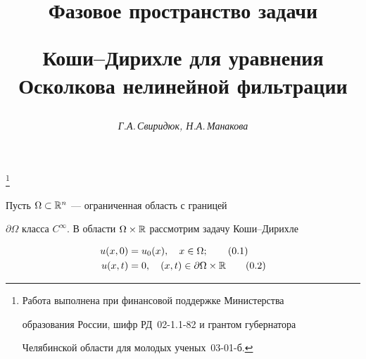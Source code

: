 

\setcounter{page}{36}















\author{\it Г.А.\,Свиридюк, Н.А.\,Манакова}




\title{Фазовое пространство задачи


Коши--Дирихле для уравнения Осколкова нелинейной фильтрации}


\thanks{Работа выполнена при финансовой поддержке Министерства


образования России, шифр РД~02-1.1-82 и грантом губернатора


Челябинской области для молодых ученых \No\,03-01-б.}





\date{}




\pagestyle{plain} %







\maketitle


\label{begin}








Пусть $\Omega \subset {\Bbb R}^n$ --- ограниченная область с границей


$\partial \Omega$ класса $C^{\infty}$. В области $\Omega \times


{\Bbb R}$ рассмотрим задачу Коши--Дирихле


\begin{align}


u(x,0) &= u_{0}(x), \quad x \in \Omega;\tag{0.1} \\


u(x, t) &= 0, \quad (x, t) \in \partial


\Omega \times {\Bbb R}\tag{0.2}


\end{align}



